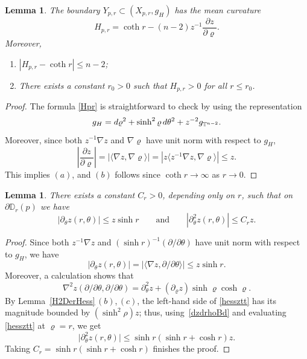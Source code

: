 \documentclass[11pt]{article}
\numberwithin{equation}{section}
\numberwithin{equation}{section}
\newtheorem{Lemma}[Theorem]{Lemma}
\def\T{\mathbb{T}}
\def\D{\mathbb{D}}
\def\ed{{\rm d}}
\begin{document}
\begin{Lemma}\label{YprMean}
The boundary $Y_{p,r}\subset (X_{p,r}, g_H)$ has the mean curvature
\begin{equation}\label{Hpr}
	H_{p,r}=\coth r-(n-2)z^{-1}\frac{\partial z}{\partial \varrho}.
\end{equation}
Moreover,
\begin{enumerate}\itemsep=0pt
    \item[$(a)$] $|H_{p,r} - \coth r| \leq n-2$;
	\item[$(b)$] There exists a constant $r_0>0$ such that $H_{p,r}>0$ for all $r\leq r_0$.
\end{enumerate}

\end{Lemma}
\begin{proof}
The formula \eqref{Hpr} is straightforward to check by using the representation
\[
	g_H = \ed\varrho^2 + \sinh^2\varrho\,\ed\theta^2 + z^{-2}g_{\T^{n-2}}.
\]
Moreover, since both $z^{-1}\nabla z$ and $\nabla \varrho$ have unit norm with respect to $g_H$,
\begin{equation}\label{dzdrhoBd}
\left|\frac{\partial z}{\partial \varrho}\right|
= \left|\bigl\langle\nabla z, \nabla \varrho \bigr\rangle\right| =\left|z\bigl\langle z^{-1}\nabla z, \nabla \varrho \bigr\rangle\right|\le z.
\end{equation}
This implies $(a)$, and $(b)$ follows since $\coth r\rightarrow\infty$ as
$r\rightarrow 0$.
\end{proof}

\begin{Lemma}\label{dthetazEst}
	There exists a constant $C_r>0$, depending only on $r$, such that on $\partial\D_r(p)$ we have
	\begin{equation*}
		\left|\partial_\theta z (r,\theta)\right| \le z \sinh r \qquad
		\mbox{and}\qquad
		\left|\partial_\theta^2 z(r,\theta)\right| \le C_r z.
	\end{equation*}
\end{Lemma}
\begin{proof}
	Since both $z^{-1}\nabla z$ and $(\sinh r)^{-1}(\partial/\partial\theta)$
	have unit norm with respect to $g_{H}$, we have
	\[
		|\partial_\theta z(r,\theta)| = \left|\bigl\langle\nabla z, \partial/\partial\theta\bigr\rangle\right|
		\le z\sinh r.
	\]
	Moreover, a calculation shows that
	\begin{equation}\label{hessztt}
		\nabla^2 z (\partial/\partial\theta,\partial/\partial\theta)
		= \partial_\theta^2 z  +(\partial_\varrho z) \sinh \varrho \cosh \varrho.
	\end{equation}
	By Lemma~\ref{H2DerHess}\,$(b)$,\,$(c)$, the left-hand side of \eqref{hessztt} has its magnitude bounded
	by $(\sinh^2\rho)z$; thus, using~\eqref{dzdrhoBd} and evaluating
	\eqref{hessztt} at $\varrho = r$, we get
	\[
		\big|\partial_\theta^2 z(r,\theta)\big| \le \sinh r (\sinh r + \cosh r) z.
	\]
	Taking $C_r  = \sinh r(\sinh r + \cosh r)$ finishes the proof.
\end{proof}
\end{document}
